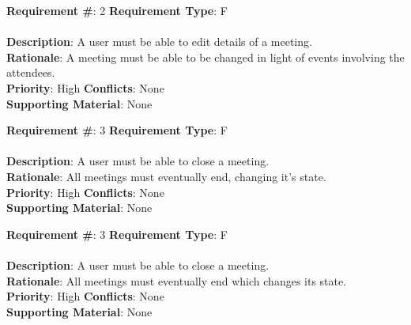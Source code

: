 \documentclass[11pt, oneside]{article}
\begin{document}
\begin{framed}
	\noindent\textbf{Requirement \#}: 2 \hfill \textbf{Requirement Type}: F \hfill\\\\
	\noindent\textbf{Description}: A user must be able to edit details of a meeting. \\
	\textbf{Rationale}: A meeting must be able to be changed in light of events involving the attendees. \\
	\textbf{Priority}: High \hfill \textbf{Conflicts}: None \hfill\\
	\textbf{Supporting Material}: None\\
\end{framed}

\begin{framed}
	\noindent\textbf{Requirement \#}: 3 \hfill \textbf{Requirement Type}: F \hfill\\\\
	\noindent\textbf{Description}: A user must be able to close a meeting. \\
	\textbf{Rationale}: All meetings must eventually end, changing it's state. \\
	\textbf{Priority}: High \hfill \textbf{Conflicts}: None \hfill\\
	\textbf{Supporting Material}: None\\
\end{framed}

\begin{framed}
	\noindent\textbf{Requirement \#}: 3 \hfill \textbf{Requirement Type}: F \hfill\\\\
	\noindent\textbf{Description}: A user must be able to close a meeting. \\
	\textbf{Rationale}: All meetings must eventually end which changes its state. \\
	\textbf{Priority}: High \hfill \textbf{Conflicts}: None \hfill\\
	\textbf{Supporting Material}: None\\
\end{framed}
\end{document}
